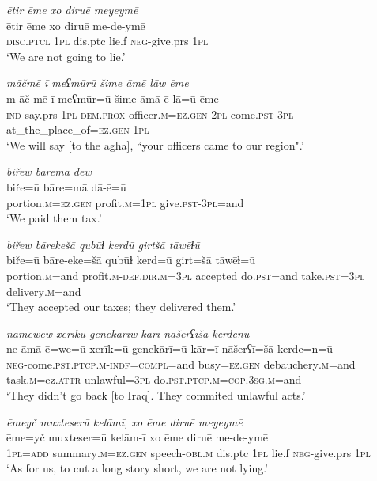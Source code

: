 \ea \label{BP.89}
\textit{ētir ēme xo diruē meyeymē} \\ 
\gll ētir ēme xo diruē me-de-ymē \\ 
 \textsc{disc.ptcl} \textsc{1pl} dis.ptc lie.f \textsc{neg-}give.prs \textsc{1pl} \\ 
\glt `We are not going to lie.'
\z 
 
\ea \label{BP.90}
\textit{māčmē ī meʕmūrū šime āmē lāw ēme} \\ 
\gll m-āč-mē ī meʕmūr=ū šime āmā-ē lā=ū ēme \\ 
 \textsc{ind-}say.prs\textsc{-\textsc{1pl}} \textsc{dem.prox} officer\textsc{.m}\textsc{=ez.gen} \textsc{2pl} come\textsc{.pst}\textsc{-3pl} at\_the\_place\_of\textsc{=ez.gen} \textsc{1pl} \\ 
\glt `We will say [to the agha], “your officers came to our region".'
\z 
 
\ea \label{BP.91}
\textit{biřew bāremā dēw} \\ 
\gll biře=ū bāre=mā dā-ē=ū \\ 
 portion\textsc{.m}\textsc{=ez.gen} profit\textsc{.m}\textsc{=\textsc{1pl}} give\textsc{.pst}\textsc{-3pl}=and \\ 
\glt `We paid them tax.'
\z 
 
\ea \label{BP.92}
\textit{biřew bārekešā qubūɫ kerdū girtšā tāwēɫū} \\ 
\gll biře=ū bāre-eke=šā qubūɫ kerd=ū girt=šā tāwēɫ=ū \\ 
 portion\textsc{.m}=and profit\textsc{.m}\textsc{-def}\textsc{.dir}\textsc{.m}\textsc{=3pl} accepted do\textsc{.pst}=and take\textsc{.pst}\textsc{=3pl} delivery\textsc{.m}=and \\ 
\glt `They accepted our taxes; they delivered them.'
\z 
 
\ea \label{BP.94}
\textit{nāmēwew xerīkū genekārīw kārī nāšerʕīšā kerdenū} \\ 
\gll ne-āmā-ē=we=ū xerīk=ū genekārī=ū kār=ī nāšerʕī=šā kerde=n=ū \\ 
 \textsc{neg-}come\textsc{.pst}\textsc{.ptcp}\textsc{.m}\textsc{-indf}\textsc{=compl}=and busy\textsc{=ez.gen} debauchery\textsc{.m}=and task\textsc{.m}=ez.\textsc{attr} unlawful\textsc{=3pl} do\textsc{.pst}\textsc{.ptcp}\textsc{.m}\textsc{=cop}\textsc{.3sg}\textsc{.m}=and \\ 
\glt `They didn’t go back [to Iraq]. They commited unlawful acts.'
\z 
 
\ea \label{BP.95}
\textit{ēmeyč muxteserū kelāmī, xo ēme diruē meyeymē} \\ 
\gll ēme=yč muxteser=ū kelām-ī xo ēme diruē me-de-ymē \\ 
 \textsc{1pl}\textsc{=add} summary\textsc{.m}\textsc{=ez.gen} speech\textsc{-obl}\textsc{.m} dis.ptc \textsc{1pl} lie.f \textsc{neg-}give.prs \textsc{1pl} \\ 
\glt `As for us, to cut a long story short, we are not lying.'
\z 
 
